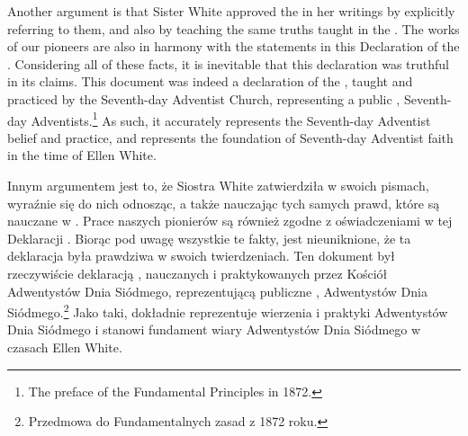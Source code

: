 Another argument is that Sister White approved the  in her writings by explicitly referring to them, and also by teaching the same truths taught in the . The works of our pioneers are also in harmony with the statements in this Declaration of the . Considering all of these facts, it is inevitable that this declaration was truthful in its claims. This document was indeed a declaration of the , taught and practiced by the Seventh-day Adventist Church, representing a public ,  Seventh-day Adventists.\footnote{The preface of the Fundamental Principles in 1872.} As such, it accurately represents the Seventh-day Adventist belief and practice, and represents the foundation of Seventh-day Adventist faith in the time of Ellen White.


Innym argumentem jest to, że Siostra White zatwierdziła  w swoich pismach, wyraźnie się do nich odnosząc, a także nauczając tych samych prawd, które są nauczane w . Prace naszych pionierów są również zgodne z oświadczeniami w tej Deklaracji . Biorąc pod uwagę wszystkie te fakty, jest nieuniknione, że ta deklaracja była prawdziwa w swoich twierdzeniach. Ten dokument był rzeczywiście deklaracją , nauczanych i praktykowanych przez Kościół Adwentystów Dnia Siódmego, reprezentującą publiczne ,  Adwentystów Dnia Siódmego.\footnote{Przedmowa do Fundamentalnych zasad z 1872 roku.} Jako taki, dokładnie reprezentuje wierzenia i praktyki Adwentystów Dnia Siódmego i stanowi fundament wiary Adwentystów Dnia Siódmego w czasach Ellen White.



